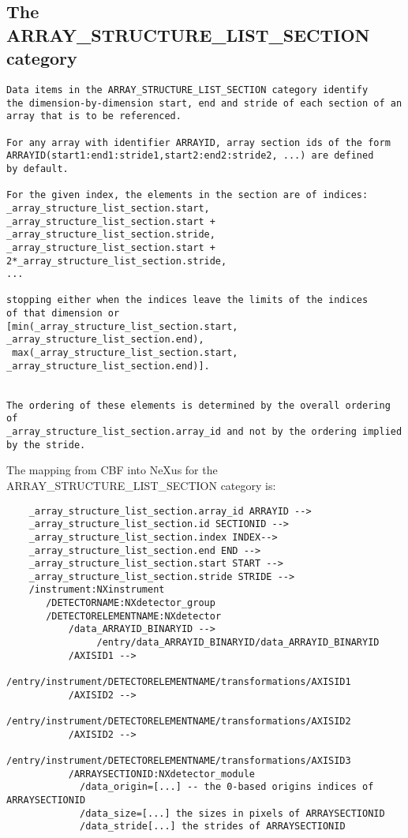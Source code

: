 \documentclass[11pt]{article}
\begin{document}
\subsection{The ARRAY\_STRUCTURE\_LIST\_SECTION category}

{\footnotesize\begin{verbatim}
Data items in the ARRAY_STRUCTURE_LIST_SECTION category identify
the dimension-by-dimension start, end and stride of each section of an
array that is to be referenced.

For any array with identifier ARRAYID, array section ids of the form
ARRAYID(start1:end1:stride1,start2:end2:stride2, ...) are defined
by default.

For the given index, the elements in the section are of indices:
_array_structure_list_section.start,
_array_structure_list_section.start + _array_structure_list_section.stride,
_array_structure_list_section.start + 2*_array_structure_list_section.stride,
...

stopping either when the indices leave the limits of the indices
of that dimension or 
[min(_array_structure_list_section.start, _array_structure_list_section.end),
 max(_array_structure_list_section.start, _array_structure_list_section.end)].


The ordering of these elements is determined by the overall ordering of
_array_structure_list_section.array_id and not by the ordering implied
by the stride.

\end{verbatim}

The mapping from CBF into NeXus for the ARRAY\_STRUCTURE\_LIST\_SECTION
category is:

\begin{verbatim} 
    _array_structure_list_section.array_id ARRAYID -->
    _array_structure_list_section.id SECTIONID -->
    _array_structure_list_section.index INDEX-->
    _array_structure_list_section.end END -->
    _array_structure_list_section.start START -->
    _array_structure_list_section.stride STRIDE -->
    /instrument:NXinstrument       
       /DETECTORNAME:NXdetector_group
       /DETECTORELEMENTNAME:NXdetector
           /data_ARRAYID_BINARYID -->
                /entry/data_ARRAYID_BINARYID/data_ARRAYID_BINARYID
           /AXISID1 -->
                /entry/instrument/DETECTORELEMENTNAME/transformations/AXISID1
           /AXISID2 -->
                /entry/instrument/DETECTORELEMENTNAME/transformations/AXISID2 
           /AXISID2 -->
                /entry/instrument/DETECTORELEMENTNAME/transformations/AXISID3
           /ARRAYSECTIONID:NXdetector_module
             /data_origin=[...] -- the 0-based origins indices of ARRAYSECTIONID
             /data_size=[...] the sizes in pixels of ARRAYSECTIONID
             /data_stride[...] the strides of ARRAYSECTIONID
\end{verbatim}      
}
\end{document}
